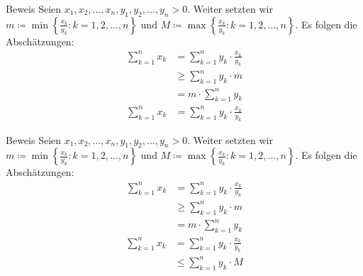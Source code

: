 \documentclass[10pt]{beamer}
\begin{document}
\begin{frame}{Beweis}
     Seien \( x_{1}, x_{2}, \ldots, x_{n}, y_{1}, y_{2}, \ldots, y_{n} > 0 \). Weiter setzten wir \( m \coloneq \min\left\{ \frac{x_{k}}{y_{k}} : k = 1, 2, \ldots, n \right\} \) und \( M \coloneq \max\left\{ \frac{x_{k}}{y_{k}} : k = 1, 2, \ldots, n \right\} \). Es folgen die Abschätzungen:
     \begin{align*}
        \sum_{k = 1}^{n} x_{k}
        & = \sum_{k = 1}^{n} y_{k} \cdot \frac{x_{k}}{y_{k}} \\
        & \geq \sum_{k = 1}^{n} y_{k} \cdot m \\
        & = m \cdot \sum_{k = 1}^{n} y_{k}
     \end{align*}
     \begin{align*}
        \sum_{k = 1}^{n} x_{k}
        & = \sum_{k = 1}^{n} y_{k} \cdot \frac{x_{k}}{y_{k}}
     \end{align*}
\end{frame}



\begin{frame}{Beweis}
     Seien \( x_{1}, x_{2}, \ldots, x_{n}, y_{1}, y_{2}, \ldots, y_{n} > 0 \). Weiter setzten wir \( m \coloneq \min\left\{ \frac{x_{k}}{y_{k}} : k = 1, 2, \ldots, n \right\} \) und \( M \coloneq \max\left\{ \frac{x_{k}}{y_{k}} : k = 1, 2, \ldots, n \right\} \). Es folgen die Abschätzungen:
     \begin{align*}
        \sum_{k = 1}^{n} x_{k}
        & = \sum_{k = 1}^{n} y_{k} \cdot \frac{x_{k}}{y_{k}} \\
        & \geq \sum_{k = 1}^{n} y_{k} \cdot m \\
        & = m \cdot \sum_{k = 1}^{n} y_{k}
     \end{align*}
     \begin{align*}
        \sum_{k = 1}^{n} x_{k}
        & = \sum_{k = 1}^{n} y_{k} \cdot \frac{x_{k}}{y_{k}} \\
        & \leq \sum_{k = 1}^{n} y_{k} \cdot M
     \end{align*}
\end{frame}
\end{document}
